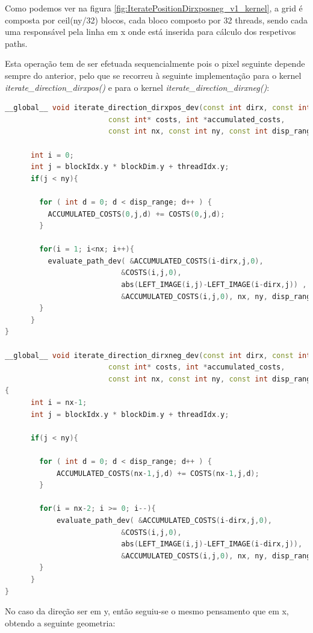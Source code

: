 \documentclass[pdftex,12pt,a4paper]{report}
\begin{document}
Como podemos ver na figura \ref{fig:IteratePositionDirxposneg_v1_kernel}, a grid é composta por ceil(ny/32) blocos, cada bloco composto por 32 threads, sendo cada uma responsável pela linha em x onde está inserida para cálculo dos respetivos paths.

Esta operação tem de ser efetuada sequencialmente pois o pixel seguinte depende sempre do anterior, pelo que se recorreu à seguinte implementação para o kernel \textit{iterate\_direction\_dirxpos()} e para o kernel \textit{iterate\_direction\_dirxneg()}:

\begin{lstlisting}[language=c++, basicstyle=\scriptsize]
__global__ void iterate_direction_dirxpos_dev(const int dirx, const int *left_image,
                        const int* costs, int *accumulated_costs,
                        const int nx, const int ny, const int disp_range ){

      int i = 0;
      int j = blockIdx.y * blockDim.y + threadIdx.y;
      if(j < ny){

        for ( int d = 0; d < disp_range; d++ ) {
          ACCUMULATED_COSTS(0,j,d) += COSTS(0,j,d);
        }

        for(i = 1; i<nx; i++){
          evaluate_path_dev( &ACCUMULATED_COSTS(i-dirx,j,0),
                           &COSTS(i,j,0),
                           abs(LEFT_IMAGE(i,j)-LEFT_IMAGE(i-dirx,j)) ,
                           &ACCUMULATED_COSTS(i,j,0), nx, ny, disp_range);
        }
      }
}

__global__ void iterate_direction_dirxneg_dev(const int dirx, const int *left_image,
                        const int* costs, int *accumulated_costs,
                        const int nx, const int ny, const int disp_range )
{
      int i = nx-1;
      int j = blockIdx.y * blockDim.y + threadIdx.y;

      if(j < ny){

        for ( int d = 0; d < disp_range; d++ ) {
            ACCUMULATED_COSTS(nx-1,j,d) += COSTS(nx-1,j,d);
        }

        for(i = nx-2; i >= 0; i--){
            evaluate_path_dev( &ACCUMULATED_COSTS(i-dirx,j,0),
                           &COSTS(i,j,0),
                           abs(LEFT_IMAGE(i,j)-LEFT_IMAGE(i-dirx,j)),
                           &ACCUMULATED_COSTS(i,j,0), nx, ny, disp_range );
        }
      }
}
\end{lstlisting} 
\newpage
No caso da direção ser em y, então seguiu-se o mesmo pensamento que em x, obtendo a seguinte geometria:
\end{document}
